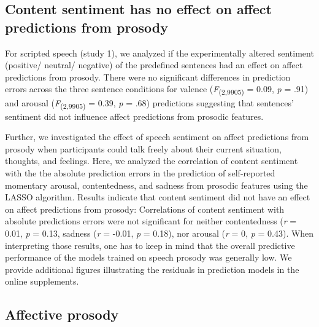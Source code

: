 \documentclass[
  english,
  man,floatsintext]{apa6}
\begin{document}
\hypertarget{content-sentiment-has-no-effect-on-affect-predictions-from-prosody}{%
\subsection{Content sentiment has no effect on affect predictions from prosody}\label{content-sentiment-has-no-effect-on-affect-predictions-from-prosody}}

For scripted speech (study 1), we analyzed if the experimentally altered sentiment (positive/ neutral/ negative) of the predefined sentences had an effect on affect predictions from prosody. There were no significant differences in prediction errors across the three sentence conditions for valence (\emph{F}\textsubscript{(2,9905)} = 0.09,
\emph{p} = .91) and arousal (\emph{F}\textsubscript{(2,9905)} = 0.39,
\emph{p} = .68) predictions suggesting that sentences' sentiment did not influence affect predictions from prosodic features.

Further, we investigated the effect of speech sentiment on affect predictions from prosody when participants could talk freely about their current situation, thoughts, and feelings. Here, we analyzed the correlation of content sentiment with the the absolute prediction errors in the prediction of self-reported momentary arousal, contentedness, and sadness from prosodic features using the LASSO algorithm. Results indicate that content sentiment did not have an effect on affect predictions from prosody: Correlations of content sentiment with absolute predictions errors were not significant for neither contentedness (\emph{r} = 0.01, \emph{p} = 0.13, sadness (\emph{r} = -0.01, \emph{p} = 0.18), nor arousal (\emph{r} = 0, \emph{p} = 0.43). When interpreting those results, one has to keep in mind that the overall predictive performance of the models trained on speech prosody was generally low. We provide additional figures illustrating the residuals in prediction models in the online supplements.

\hypertarget{affective-prosody}{%
\subsection{Affective prosody}\label{affective-prosody}}
\end{document}
